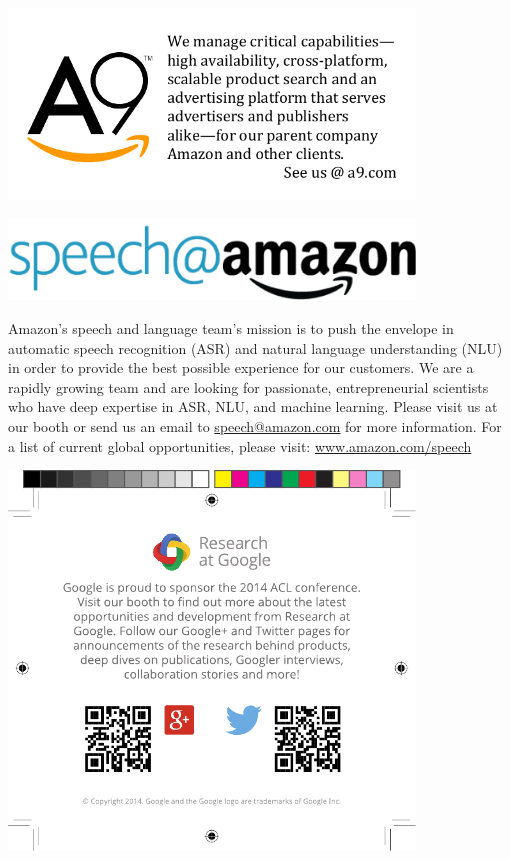 
\vfill

\includegraphics[width=4.25in]{content/ads/silver/A9-Ad.pdf}

\newpage
\thispagestyle{empty}

\includegraphics[width=4.25in]{content/ads/gold/Amazon.png}

Amazon’s speech and language team’s mission is to push the envelope in
automatic speech recognition (ASR) and natural language understanding
(NLU) in order to provide the best possible experience for our
customers. We are a rapidly growing team and are looking for
passionate, entrepreneurial scientists who have deep expertise in ASR,
NLU, and machine learning.  Please visit us at our booth or send us an
email to \url{speech@amazon.com} for more information.  For a list of
current global opportunities, please visit: \url{www.amazon.com/speech}

\vfill

\includegraphics[width=4.25in]{content/ads/gold/Google-Ad.pdf}

